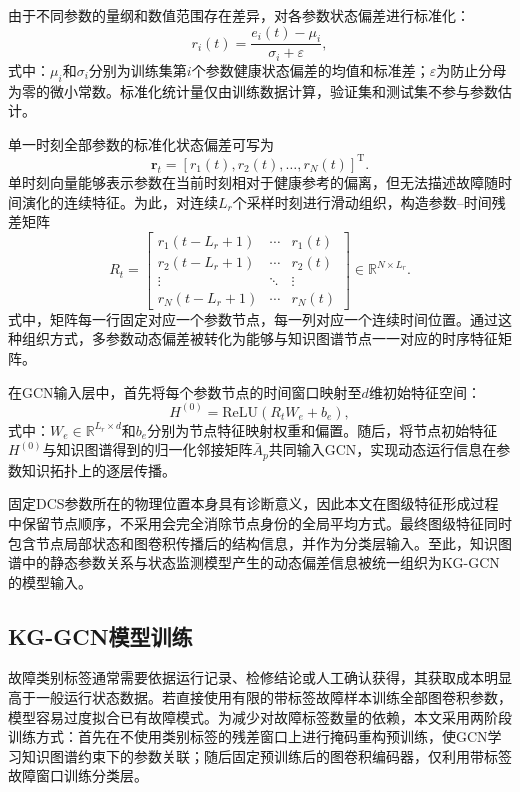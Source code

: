 由于不同参数的量纲和数值范围存在差异，对各参数状态偏差进行标准化：
\begin{equation}
r_i(t)=\frac{e_i(t)-\mu_i}{\sigma_i+\varepsilon},
\end{equation}
式中：$\mu_i$和$\sigma_i$分别为训练集第$i$个参数健康状态偏差的均值和标准差；$\varepsilon$为防止分母为零的微小常数。标准化统计量仅由训练数据计算，验证集和测试集不参与参数估计。

单一时刻全部参数的标准化状态偏差可写为
\begin{equation}
\mathbf r_t=[r_1(t),r_2(t),\ldots,r_N(t)]^{\mathrm T}.
\end{equation}
单时刻向量能够表示参数在当前时刻相对于健康参考的偏离，但无法描述故障随时间演化的连续特征。为此，对连续$L_r$个采样时刻进行滑动组织，构造参数--时间残差矩阵
\begin{equation}
R_t=
\begin{bmatrix}
r_1(t-L_r+1)&\cdots&r_1(t)\\
r_2(t-L_r+1)&\cdots&r_2(t)\\
\vdots&\ddots&\vdots\\
r_N(t-L_r+1)&\cdots&r_N(t)
\end{bmatrix}
\in\mathbb R^{N\times L_r}.
\end{equation}
式中，矩阵每一行固定对应一个参数节点，每一列对应一个连续时间位置。通过这种组织方式，多参数动态偏差被转化为能够与知识图谱节点一一对应的时序特征矩阵。

在GCN输入层中，首先将每个参数节点的时间窗口映射至$d$维初始特征空间：
\begin{equation}
H^{(0)}=\mathrm{ReLU}(R_tW_e+b_e),
\end{equation}
式中：$W_e\in\mathbb R^{L_r\times d}$和$b_e$分别为节点特征映射权重和偏置。随后，将节点初始特征$H^{(0)}$与知识图谱得到的归一化邻接矩阵$\bar A_p$共同输入GCN，实现动态运行信息在参数知识拓扑上的逐层传播。

固定DCS参数所在的物理位置本身具有诊断意义，因此本文在图级特征形成过程中保留节点顺序，不采用会完全消除节点身份的全局平均方式。最终图级特征同时包含节点局部状态和图卷积传播后的结构信息，并作为分类层输入。至此，知识图谱中的静态参数关系与状态监测模型产生的动态偏差信息被统一组织为KG-GCN的模型输入。

\subsection{KG-GCN模型训练}
\label{subsec:kg_training_v7}

故障类别标签通常需要依据运行记录、检修结论或人工确认获得，其获取成本明显高于一般运行状态数据。若直接使用有限的带标签故障样本训练全部图卷积参数，模型容易过度拟合已有故障模式。为减少对故障标签数量的依赖，本文采用两阶段训练方式：首先在不使用类别标签的残差窗口上进行掩码重构预训练，使GCN学习知识图谱约束下的参数关联；随后固定预训练后的图卷积编码器，仅利用带标签故障窗口训练分类层。

